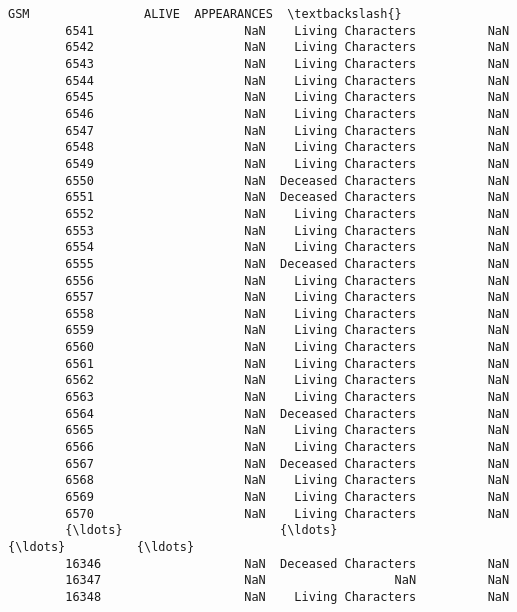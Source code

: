 \documentclass[11pt]{article}
\begin{document}
\begin{Verbatim}[commandchars=\\\{\}]
                                 GSM                ALIVE  APPEARANCES  \textbackslash{}
        6541                     NaN    Living Characters          NaN   
        6542                     NaN    Living Characters          NaN   
        6543                     NaN    Living Characters          NaN   
        6544                     NaN    Living Characters          NaN   
        6545                     NaN    Living Characters          NaN   
        6546                     NaN    Living Characters          NaN   
        6547                     NaN    Living Characters          NaN   
        6548                     NaN    Living Characters          NaN   
        6549                     NaN    Living Characters          NaN   
        6550                     NaN  Deceased Characters          NaN   
        6551                     NaN  Deceased Characters          NaN   
        6552                     NaN    Living Characters          NaN   
        6553                     NaN    Living Characters          NaN   
        6554                     NaN    Living Characters          NaN   
        6555                     NaN  Deceased Characters          NaN   
        6556                     NaN    Living Characters          NaN   
        6557                     NaN    Living Characters          NaN   
        6558                     NaN    Living Characters          NaN   
        6559                     NaN    Living Characters          NaN   
        6560                     NaN    Living Characters          NaN   
        6561                     NaN    Living Characters          NaN   
        6562                     NaN    Living Characters          NaN   
        6563                     NaN    Living Characters          NaN   
        6564                     NaN  Deceased Characters          NaN   
        6565                     NaN    Living Characters          NaN   
        6566                     NaN    Living Characters          NaN   
        6567                     NaN  Deceased Characters          NaN   
        6568                     NaN    Living Characters          NaN   
        6569                     NaN    Living Characters          NaN   
        6570                     NaN    Living Characters          NaN   
        {\ldots}                      {\ldots}                  {\ldots}          {\ldots}   
        16346                    NaN  Deceased Characters          NaN   
        16347                    NaN                  NaN          NaN   
        16348                    NaN    Living Characters          NaN   

\end{Verbatim}
\end{document}
